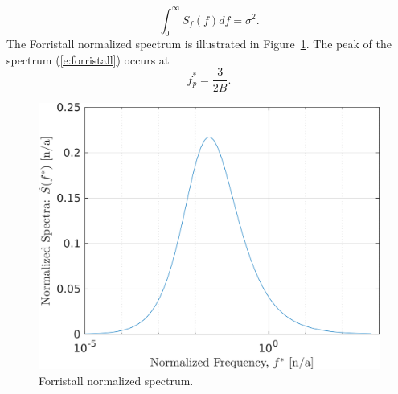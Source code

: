 \documentclass[utf8]{frontiersSCNS} %
\begin{document}
\begin{equation}
  \int_0^{\infty} S_f(f) df = \sigma^2.
\end{equation}
The Forristall normalized spectrum is illustrated in Figure~\ref{f:forristall_norm}.   The peak of the spectrum (\ref{e:forristall}) occurs at
\begin{equation}
f^*_p = \frac{3}{2B}.
\end{equation}
\begin{figure}[h!]
  \centering
  \includegraphics[width=\SFc\textwidth]{forristall_norm.png}
  \caption{Forristall normalized spectrum.}
  \label{f:forristall_norm}
\end{figure}
\end{document}
